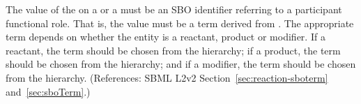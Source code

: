 The value of the   on a \SpeciesReference or a
\ModifierSpeciesReference must be an SBO identifier referring to a
participant functional role.  That is, the value must be a term derived
from \sboparticipantfunctional.  The appropriate term depends on whether
the entity is a reactant, product or modifier.  If a reactant, the term
should be chosen from the \sboreactant hierarchy; if a product, the term
should be chosen from the \sboproduct hierarchy; and if a modifier, the
term should be chosen from the \sbomodifier hierarchy.  (References: SBML
L2v2 Section~\ref{sec:reaction-sboterm} and~\ref{sec:sboTerm}.)

